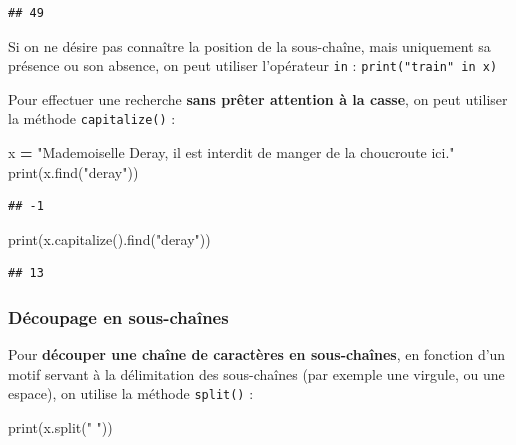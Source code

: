 \documentclass[12pt,]{book}
\newenvironment{Shaded}{\begin{snugshade}}{\end{snugshade}}
\newcommand{\StringTok}[1]{\textcolor[rgb]{0.31,0.60,0.02}{#1}}
\newcommand{\OperatorTok}[1]{\textcolor[rgb]{0.81,0.36,0.00}{\textbf{#1}}}
\newcommand{\BuiltInTok}[1]{#1}
\newcommand{\NormalTok}[1]{#1}
\numberwithin{equation}{section}
\numberwithin{countremarque}{section}
\let\BeginKnitrBlock\begin \let\EndKnitrBlock\end
\begin{document}
\begin{lstlisting}
## 49
\end{lstlisting}

\BeginKnitrBlock{remarque}
Si on ne désire pas connaître la position de la sous-chaîne, mais
uniquement sa présence ou son absence, on peut utiliser l'opérateur
\texttt{in} : \texttt{print("train"\ in\ x)}
\EndKnitrBlock{remarque}

Pour effectuer une recherche \textbf{sans prêter attention à la casse},
on peut utiliser la méthode \texttt{capitalize()} :

\begin{Shaded}
\begin{Highlighting}[]
\NormalTok{x }\OperatorTok{=} \StringTok{"Mademoiselle Deray, il est interdit de manger de la choucroute ici."}
\BuiltInTok{print}\NormalTok{(x.find(}\StringTok{"deray"}\NormalTok{))}
\end{Highlighting}
\end{Shaded}

\begin{lstlisting}
## -1
\end{lstlisting}

\begin{Shaded}
\begin{Highlighting}[]
\BuiltInTok{print}\NormalTok{(x.capitalize().find(}\StringTok{"deray"}\NormalTok{))}
\end{Highlighting}
\end{Shaded}

\begin{lstlisting}
## 13
\end{lstlisting}

\subsubsection{Découpage en
sous-chaînes}\label{decoupage-en-sous-chaines}

Pour \textbf{découper une chaîne de caractères en sous-chaînes}, en
fonction d'un motif servant à la délimitation des sous-chaînes (par
exemple une virgule, ou une espace), on utilise la méthode
\texttt{split()} :

\begin{Shaded}
\begin{Highlighting}[]
\BuiltInTok{print}\NormalTok{(x.split(}\StringTok{" "}\NormalTok{))}
\end{Highlighting}
\end{Shaded}
\end{document}
